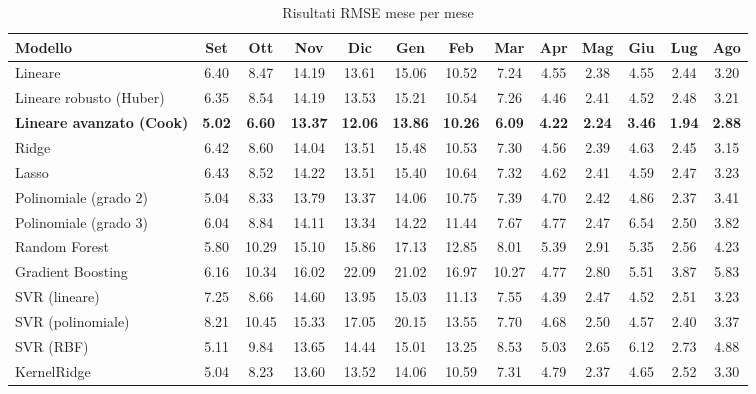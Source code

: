 \begin{table}[H]
    \tiny
    \centering
    \setlength{\tabcolsep}{4pt}
    \def\arraystretch{1.5}
    \begin{tabular}{|l|c|c|c|c|c|c|c|c|c|c|c|c|}
    \hline
        \textbf{Modello} & \textbf{Set} & \textbf{Ott} & \textbf{Nov} & \textbf{Dic} & \textbf{Gen} & \textbf{Feb} & \textbf{Mar} & \textbf{Apr} & \textbf{Mag} & \textbf{Giu} & \textbf{Lug} & \textbf{Ago} \\ \hline
        Lineare & 6.40 & 8.47 & 14.19 & 13.61 & 15.06 & 10.52 & 7.24 & 4.55 & 2.38 & 4.55 & 2.44 & 3.20 \\ \hline
        Lineare robusto (Huber) & 6.35 & 8.54 & 14.19 & 13.53 & 15.21 & 10.54 & 7.26 & 4.46 & 2.41 & 4.52 & 2.48 & 3.21 \\ \hline
        \textbf{Lineare avanzato (Cook)} & \textbf{5.02} & \textbf{6.60} & \textbf{13.37} & \textbf{12.06} & \textbf{13.86} & \textbf{10.26} & \textbf{6.09} & \textbf{4.22} & \textbf{2.24} & \textbf{3.46} & \textbf{1.94} & \textbf{2.88} \\ \hline
        Ridge & 6.42 & 8.60 & 14.04 & 13.51 & 15.48 & 10.53 & 7.30 & 4.56 & 2.39 & 4.63 & 2.45 & 3.15 \\ \hline
        Lasso & 6.43 & 8.52 & 14.22 & 13.51 & 15.40 & 10.64 & 7.32 & 4.62 & 2.41 & 4.59 & 2.47 & 3.23 \\ \hline
        Polinomiale (grado 2) & 5.04 & 8.33 & 13.79 & 13.37 & 14.06 & 10.75 & 7.39 & 4.70 & 2.42 & 4.86 & 2.37 & 3.41 \\ \hline
        Polinomiale (grado 3) & 6.04 & 8.84 & 14.11 & 13.34 & 14.22 & 11.44 & 7.67 & 4.77 & 2.47 & 6.54 & 2.50 & 3.82 \\ \hline
        Random Forest & 5.80 & 10.29 & 15.10 & 15.86 & 17.13 & 12.85 & 8.01 & 5.39 & 2.91 & 5.35 & 2.56 & 4.23 \\ \hline
        Gradient Boosting & 6.16 & 10.34 & 16.02 & 22.09 & 21.02 & 16.97 & 10.27 & 4.77 & 2.80 & 5.51 & 3.87 & 5.83 \\ \hline
        SVR (lineare) & 7.25 & 8.66 & 14.60 & 13.95 & 15.03 & 11.13 & 7.55 & 4.39 & 2.47 & 4.52 & 2.51 & 3.23 \\ \hline
        SVR (polinomiale) & 8.21 & 10.45 & 15.33 & 17.05 & 20.15 & 13.55 & 7.70 & 4.68 & 2.50 & 4.57 & 2.40 & 3.37 \\ \hline
        SVR (RBF) & 5.11 & 9.84 & 13.65 & 14.44 & 15.01 & 13.25 & 8.53 & 5.03 & 2.65 & 6.12 & 2.73 & 4.88 \\ \hline
        KernelRidge & 5.04 & 8.23 & 13.60 & 13.52 & 14.06 & 10.59 & 7.31 & 4.79 & 2.37 & 4.65 & 2.52 & 3.30 \\ \hline
    \end{tabular}
    \caption{Risultati RMSE mese per mese}
    \label{fig:risultati-pm10-rmse-mese}
\end{table}

